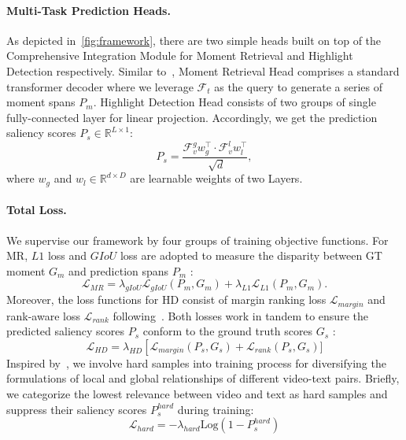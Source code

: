 \paragraph{Multi-Task Prediction Heads.}
As depicted in~\cref{fig:framework}, there are two simple heads built on top of the Comprehensive Integration Module for Moment Retrieval and Highlight Detection respectively.
Similar to~\cite{momentdetr,qddetr,eatr}, Moment Retrieval Head comprises a standard transformer decoder where we leverage $\mathcal{F}_t$ as the query to generate a series of moment spans $P_m$.
Highlight Detection Head consists of two groups of single fully-connected layer for linear projection.
Accordingly, we get the prediction saliency scores $P_{s} \in \mathbb{R}^{L\times 1} $:
\begin{equation}
    P_s = \frac{\mathcal{F}_v^{g} w_g^{\top } \cdot\mathcal{F}_v^{l} w_l^{\top }}{\sqrt[]{d} },
\end{equation}
where $w_{g}$ and $w_{l} \in \mathbb{R}^{d\times D}$ are learnable weights of two Layers.

\paragraph{Total Loss.}
We supervise our framework by four groups of training objective functions.
For MR, $L1$ loss and $GIoU$ loss are adopted to measure the disparity between GT moment $G_m$ and prediction spans $P_m$ : 
\begin{equation}
    \mathcal{L}_{MR} = \lambda_{gIoU}\mathcal{L}_{gIoU}(P_m,G_m) + \lambda_{L1}\mathcal{L}_{L1}(P_m,G_m).
\end{equation}
Moreover, the loss functions for HD consist of margin ranking loss $\mathcal{L}_{margin}$ and rank-aware loss $\mathcal{L}_{rank}$ following~\cite{qddetr}. Both losses work in tandem to ensure the predicted saliency scores $P_s$ conform to the ground truth scores $G_s$ :
\begin{equation}
    \mathcal{L}_{HD} = \lambda_{HD}\left[\mathcal{L}_{margin}(P_s,G_s) + \mathcal{L}_{rank}(P_s,G_s)]\right.
\end{equation}
Inspired by~\cite{qddetr, dong2017}, we involve hard samples into training process for diversifying the formulations of local and global relationships of different video-text pairs. Briefly, we categorize the lowest relevance between video and text as hard samples and suppress their saliency scores $P_s^{hard}$ during training:   
\begin{equation}
    \mathcal{L}_{hard} = -\lambda_{hard}\mathrm{Log}(1-P_s^{hard})
\end{equation}

